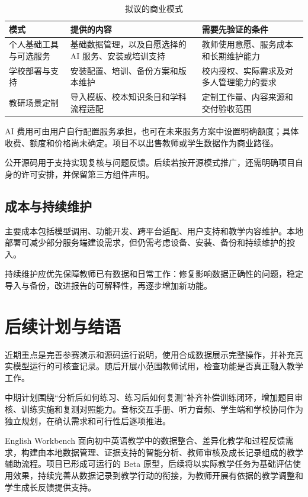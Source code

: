 \documentclass[11pt,a4paper,fontset=none]{ctexart}
\begin{document}
\begin{table}[htbp]
\centering
\small
\begin{tabularx}{\textwidth}{@{}L{3.6cm}YY@{}}
\toprule
\textbf{模式} & \textbf{提供的内容} & \textbf{需要先验证的条件} \\
\midrule
个人基础工具与可选服务 & 基础数据管理，以及自愿选择的 AI 服务、安装或培训支持 & 教师使用意愿、服务成本和长期维护能力 \\
学校部署与支持 & 安装配置、培训、备份方案和版本维护 & 校内授权、实际需求及对多人管理能力的要求 \\
教研场景定制 & 导入模板、校本知识条目和学科流程适配 & 定制工作量、内容来源和交付验收范围 \\
\bottomrule
\end{tabularx}
\caption{拟议的商业模式}
\end{table}

AI 费用可由用户自行配置服务承担，也可在未来服务方案中设置明确额度；具体收费、额度和价格尚未确定。项目不以出售教师或学生数据作为商业路径。

公开源码用于支持实现复核与问题反馈。后续若按开源模式推广，还需明确项目自身的许可安排，并保留第三方组件声明。

\subsection{成本与持续维护}

主要成本包括模型调用、功能开发、跨平台适配、用户支持和教学内容维护。本地部署可减少部分服务端建设需求，但仍需考虑设备、安装、备份和持续维护的投入。

持续维护应优先保障教师已有数据和日常工作：修复影响数据正确性的问题，稳定导入与备份，改进报告的可解释性，再逐步增加新功能。

\section{后续计划与结语}

近期重点是完善参赛演示和源码运行说明，使用合成数据展示完整操作，并补充真实模型运行的可核查记录。随后开展小范围教师试用，检查功能是否真正融入教学工作。

中期计划围绕“分析后如何练习、练习后如何复测”补齐补偿训练闭环，增加题目审核、训练实施和复测对照能力。音标交互手册、听力音频、学生端和学校协同作为独立规划，在确认需求和可行性后逐项推进。

English Workbench 面向初中英语教学中的数据整合、差异化教学和过程反馈需求，构建由本地数据管理、证据支持的智能分析、教师审核及成长记录组成的教学辅助流程。项目已形成可运行的 Beta 原型，后续将以实际教学任务为基础评估使用效果，持续完善从数据记录到教学行动的衔接，为教师开展有依据的教学调整和学生成长反馈提供支持。
\end{document}
